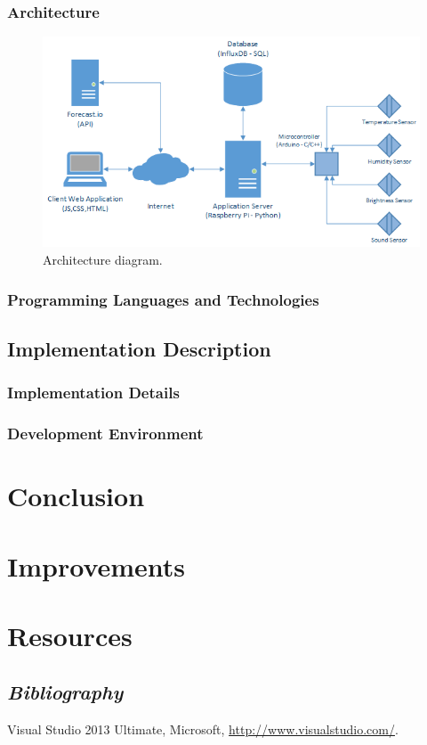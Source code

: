 \documentclass[12pt]{article}
\begin{document}
\subsubsection{Architecture}
\begin{figure}[h]
    \centering
    \includegraphics[scale=0.85]{arc.png}
    \caption{Architecture diagram.}
    \label{fig:use}
\end{figure}

\subsubsection{Programming Languages and Technologies}
\subsection{Implementation Description}
\subsubsection{Implementation Details}
\subsubsection{Development Environment}
\newpage
\section{Conclusion}
\newpage
\section{Improvements}
\newpage
\section{Resources}
\subsection{\it{Bibliography}}
\begin{description}
\item Visual Studio 2013 Ultimate, Microsoft, \url{http://www.visualstudio.com/}.
\end{description}
\end{document}
